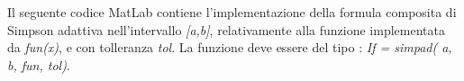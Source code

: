 Il seguente codice MatLab contiene l'implementazione della formula composita di Simpson adattiva nell'intervallo \textit{[a,b]}, relativamente alla funzione implementata da \textit{fun(x)}, e con tolleranza \textit{tol}. La funzione deve essere del tipo : \textit{If = simpad( a, b, fun, tol)}.\\\
